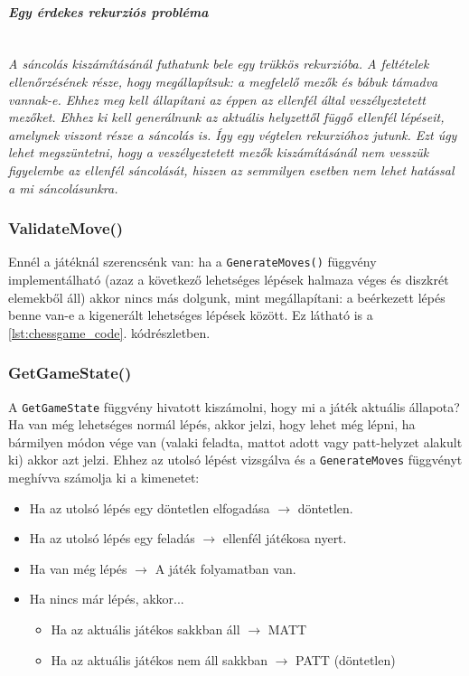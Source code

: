 \documentclass[twoside, a4paper, 12pt]{book}
\begin{document}
\paragraph{\textit{Egy érdekes rekurziós probléma}} \mbox{} \\
\textit{A sáncolás kiszámításánál futhatunk bele egy trükkös rekurzióba. A feltételek ellenőrzésének része, hogy megállapítsuk: a megfelelő mezők és bábuk támadva vannak-e. Ehhez meg kell állapítani az éppen az ellenfél által veszélyeztetett mezőket. Ehhez ki kell generálnunk az aktuális helyzettől függő ellenfél lépéseit, amelynek viszont része a sáncolás is. Így egy végtelen rekurzióhoz jutunk. Ezt úgy lehet megszüntetni, hogy a veszélyeztetett mezők kiszámításánál nem vesszük figyelembe az ellenfél sáncolását, hiszen az semmilyen esetben nem lehet hatással a mi sáncolásunkra.}

\subsubsection{ValidateMove()} \mbox{}
Ennél a játéknál szerencsénk van: ha a \texttt{GenerateMoves()} függvény implementálható (azaz a következő lehetséges lépések halmaza véges és diszkrét elemekből áll) akkor nincs más dolgunk, mint megállapítani: a beérkezett lépés benne van-e a kigenerált lehetséges lépések között. Ez látható is a \ref{lst:chessgame_code}. kódrészletben.

\subsubsection{GetGameState()}
A \texttt{GetGameState} függvény hivatott kiszámolni, hogy mi a játék aktuális állapota? Ha van még lehetséges normál lépés, akkor jelzi, hogy lehet még lépni, ha bármilyen módon vége van (valaki feladta, mattot adott vagy patt-helyzet alakult ki) akkor azt jelzi. Ehhez az utolsó lépést vizsgálva és a \texttt{GenerateMoves} függvényt meghívva számolja ki a kimenetet:

\begin{itemize}
	\item Ha az utolsó lépés egy döntetlen elfogadása $\to$ döntetlen.
	\item Ha az utolsó lépés egy feladás $\to$ ellenfél játékosa nyert.
	\item Ha van még lépés $\to$ A játék folyamatban van.
	\item Ha nincs már lépés, akkor...
	\begin{itemize}
		\item Ha az aktuális játékos sakkban áll $\to$ MATT
		\item Ha az aktuális játékos nem áll sakkban $\to$ PATT (döntetlen)
	\end{itemize}
\end{itemize}
\end{document}

